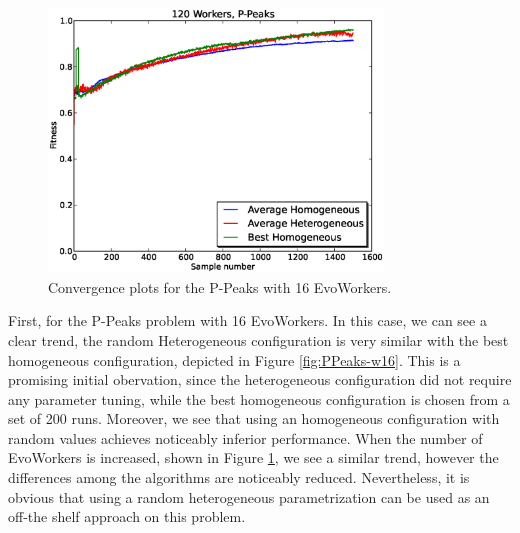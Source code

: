 \documentclass{sig-alternate}
\begin{document}
\begin{figure}[t]
\centering
\includegraphics[width=3.5in]{eps/PPeaks-w120.eps}
\caption{Convergence plots for the P-Peaks with 16 EvoWorkers.}
\label{fig:PPeaks-w120}
\end{figure}


First, for the P-Peaks problem with 16 EvoWorkers.
In this case, we can see a clear trend, the random Heterogeneous configuration is very similar with the best homogeneous configuration,
depicted in Figure \ref{fig:PPeaks-w16}.
This is a promising initial obervation, since the heterogeneous configuration did not require any parameter tuning, while the best homogeneous configuration
is chosen from a set of 200 runs.
Moreover, we see that using an homogeneous configuration with random values achieves noticeably inferior performance.
When the number of EvoWorkers is increased, shown in Figure \ref{fig:PPeaks-w120}, we see a similar trend,
however the differences among the algorithms are noticeably reduced.
Nevertheless, it is obvious that using a random heterogeneous parametrization can be used as an off-the shelf approach on this problem.
\end{document}
